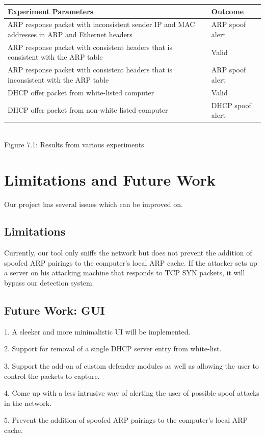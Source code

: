 \documentclass{acm_proc_article-sp}
\begin{document}
\begin{tabular}{ |m{15em}|m{7em}| }
\hline 
Experiment Parameters & Outcome \\
\hline 
 ARP response packet with inconsistent sender IP and MAC addresses in ARP and Ethernet headers & ARP spoof alert \\ 
\hline
 ARP response packet with consistent headers that is consistent with the ARP table &  Valid \\  
\hline
 ARP response packet with consistent headers that is inconsistent with the ARP table & ARP spoof alert \\
\hline
DHCP offer packet from white-listed computer & Valid \\
\hline
DHCP offer packet from non-white listed computer & DHCP spoof alert \\
\hline      
\end{tabular} \\
Figure 7.1: Results from various experiments 

\section{Limitations and Future Work}
Our project has several issues which can be improved on.

\subsection{Limitations}
Currently, our tool only sniffs the network but does not prevent the addition of spoofed ARP pairings to the computer’s local ARP cache. If the attacker sets up a server on his attacking machine that responds to TCP SYN packets, it will bypass our detection system.

\subsection{Future Work: GUI}
1. A sleeker and more minimalistic UI will be implemented.

2. Support for removal of a single DHCP server entry from white-list.

3. Support the add-on of custom defender modules as well as allowing the user to control the packets to capture.

4. Come up with a less intrusive way of alerting the user of possible spoof attacks in the network.

5. Prevent the addition of spoofed ARP pairings to the computer’s local ARP cache.
\end{document}
